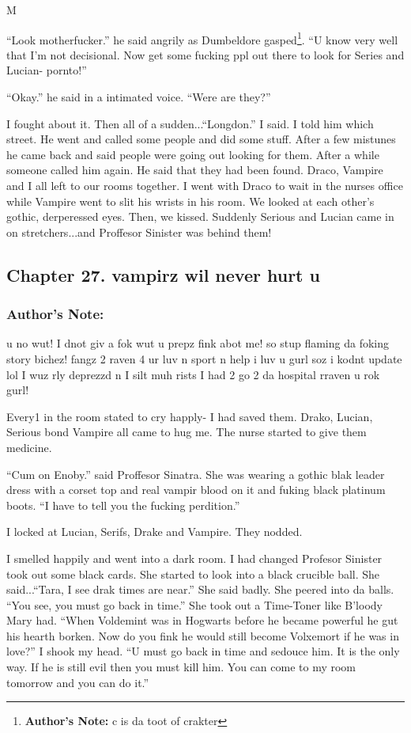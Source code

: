 M\documentclass{article}
\begin{document}
“Look motherfucker.” he said angrily as Dumbeldore gasped\footnote{\textbf{Author's Note: }c is da toot of crakter}. “U know very well that I’m not decisional. Now get some fucking ppl out there to look for Series and Lucian- pornto!”

“Okay.” he said in a intimated voice. “Were are they?”

I fought about it. Then all of a sudden...“Longdon.” I said. I told him which street. He went and called some people and did some stuff. After a few mistunes he came back and said people were going out looking for them. After a while someone called him again. He said that they had been found. Draco, Vampire and I all left to our rooms together. I went with Draco to wait in the nurses office while Vampire went to slit his wrists in his room. We looked at each other’s gothic, derperessed eyes. Then, we kissed. Suddenly Serious and Lucian came in on stretchers...and Proffesor Sinister was behind them!

\clearpage\nolinenumbers
\subsection*{Chapter 27. vampirz wil never hurt u}

\subsubsection*{Author's Note: }u no wut! I dnot giv a fok wut u prepz fink abot me! so stup flaming da foking story bichez! fangz 2 raven 4 ur luv n sport n help i luv u gurl soz i kodnt update lol I wuz rly deprezzd n I silt muh rists I had 2 go 2 da hospital rraven u rok gurl!

\textbreak
\linenumbers\resetlinenumber

Every1 in the room stated to cry happly- I had saved them. Drako, Lucian, Serious bond Vampire all came to hug me. The nurse started to give them medicine.

“Cum on Enoby.” said Proffesor Sinatra. She was wearing a gothic blak leader dress with a corset top and real vampir blood on it and fuking black platinum boots. “I have to tell you the fucking perdition.”

I locked at Lucian, Serifs, Drake and Vampire. They nodded.

I smelled happily and went into a dark room. I had changed Profesor Sinister took out some black cards. She started to look into a black crucible ball. She said...“Tara, I see drak times are near.” She said badly. She peered into da balls. “You see, you must go back in time.” She took out a Time-Toner like B’loody Mary had. “When Voldemint was in Hogwarts before he became powerful he gut his hearth borken. Now do you fink he would still become Volxemort if he was in love?” I shook my head. “U must go back in time and sedouce him. It is the only way. If he is still evil then you must kill him. You can come to my room tomorrow and you can do it.”
\end{document}
